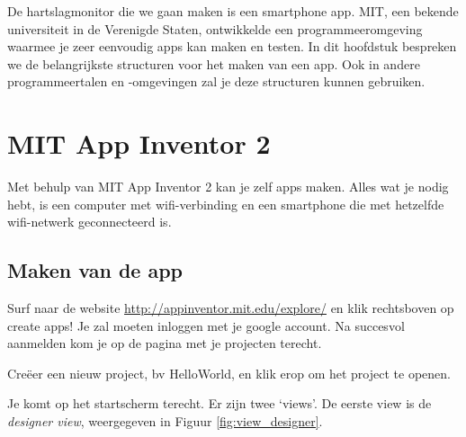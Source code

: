 
\begin{samenvatting}
De hartslagmonitor die we gaan maken is een smartphone app. MIT, een bekende universiteit in de Verenigde Staten, ontwikkelde een programmeeromgeving waarmee je zeer eenvoudig apps kan maken en testen. In dit hoofdstuk bespreken we de belangrijkste structuren voor het maken van een app. Ook in andere programmeertalen en -omgevingen zal je deze structuren kunnen gebruiken.
\end{samenvatting}
%

\section{MIT App Inventor 2}
\label{sec:Mod2_Sec1}
%
Met behulp van MIT App Inventor 2 kan je zelf apps maken. Alles wat je nodig hebt, is een computer met wifi-verbinding en een smartphone die met hetzelfde wifi-netwerk geconnecteerd is.

\subsection{Maken van de app}

Surf naar de website \url{http://appinventor.mit.edu/explore/} en klik rechtsboven op create apps! Je zal moeten inloggen met je google account. Na succesvol aanmelden kom je op de pagina met je projecten terecht. 

Cre\"eer een nieuw project, bv HelloWorld, en klik erop om het project te openen. 

Je komt op het startscherm terecht. Er zijn twee \textquoteleft views\textquoteright. De eerste view is de \emph{designer view}, weergegeven in Figuur \ref{fig:view_designer}.


